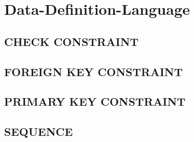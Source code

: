 \section[DCL]{Data-Definition-Language}
\label{sec:ddl}

\subsection{CHECK CONSTRAINT}
\label{sec:ddl.check_constraint}

\subsection{FOREIGN KEY CONSTRAINT}
\label{sec:ddl.foreign_key_constraint}

\subsection{PRIMARY KEY CONSTRAINT}
\label{sec:ddl.primary_key_constraint}



\subsection{SEQUENCE}
\label{sec:dcl.sequence}


